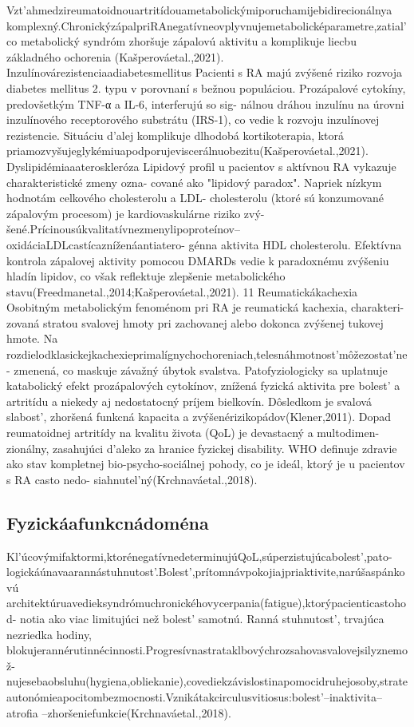 Vzt’ahmedzireumatoidnouartritídouametabolickýmiporuchamijebidirecionálnya komplexný.ChronickýzápalpriRAnegatívneovplyvnujemetabolicképarametre,zatial’co metabolický syndróm zhoršuje zápalovú aktivitu a komplikuje liecbu základného ochorenia (Kašperováetal.,2021). Inzulínovárezistenciaadiabetesmellitus Pacienti s RA majú zvýšené riziko rozvoja diabetes mellitus 2. typu v porovnaní s bežnou populáciou. Prozápalové cytokíny, predovšetkým TNF-α a IL-6, interferujú so sig- nálnou dráhou inzulínu na úrovni inzulínového receptorového substrátu (IRS-1), co vedie k rozvoju inzulínovej rezistencie. Situáciu d’alej komplikuje dlhodobá kortikoterapia, ktorá priamozvyšujeglykémiuapodporujeviscerálnuobezitu(Kašperováetal.,2021). Dyslipidémiaaateroskleróza Lipidový profil u pacientov s aktívnou RA vykazuje charakteristické zmeny ozna- cované ako "lipidový paradox". Napriek nízkym hodnotám celkového cholesterolu a LDL- cholesterolu (ktoré sú konzumované zápalovým procesom) je kardiovaskulárne riziko zvý- šené.Prícinousúkvalitatívnezmenylipoproteínov--oxidáciaLDLcastícazníženáantiatero- génna aktivita HDL cholesterolu. Efektívna kontrola zápalovej aktivity pomocou DMARDs vedie k paradoxnému zvýšeniu hladín lipidov, co však reflektuje zlepšenie metabolického stavu(Freedmanetal.,2014;Kašperováetal.,2021). 11 Reumatickákachexia Osobitným metabolickým fenoménom pri RA je reumatická kachexia, charakteri- zovaná stratou svalovej hmoty pri zachovanej alebo dokonca zvýšenej tukovej hmote. Na rozdielodklasickejkachexieprimalígnychochoreniach,telesnáhmotnost’môžezostat’ne- zmenená, co maskuje závažný úbytok svalstva. Patofyziologicky sa uplatnuje katabolický efekt prozápalových cytokínov, znížená fyzická aktivita pre bolest’ a artritídu a niekedy aj nedostatocný príjem bielkovín. Dôsledkom je svalová slabost’, zhoršená funkcná kapacita a zvýšenérizikopádov(Klener,2011). Dopad reumatoidnej artritídy na kvalitu života (QoL) je devastacný a multodimen- zionálny, zasahujúci d’aleko za hranice fyzickej disability. WHO definuje zdravie ako stav kompletnej bio-psycho-sociálnej pohody, co je ideál, ktorý je u pacientov s RA casto nedo- siahnutel’ný(Krchnaváetal.,2018).


\subsection{Fyzickáafunkcnádoména}

Kl’úcovýmifaktormi,ktorénegatívnedeterminujúQoL,súperzistujúcabolest’,pato- logickáúnavaarannástuhnutost’.Bolest’,prítomnávpokojiajpriaktivite,narúšaspánkovú architektúruavedieksyndrómuchronickéhovycerpania(fatigue),ktorýpacienticastohod- notia ako viac limitujúci než bolest’ samotnú. Ranná stuhnutost’, trvajúca nezriedka hodiny, blokujerannérutinnécinnosti.Progresívnastrataklbovýchrozsahovasvalovejsilyznemož- nujesebaobsluhu(hygiena,obliekanie),covediekzávislostinapomocidruhejosoby,strate autonómieapocitombezmocnosti.Vznikátakcirculusvitiosus:bolest’--inaktivita--atrofia --zhoršeniefunkcie(Krchnaváetal.,2018).


